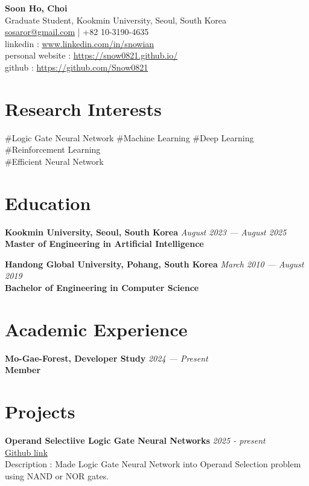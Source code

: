 \documentclass[11pt, a4paper]{article}
\newcommand{\itemheader}[2]{
    \noindent\textbf{#1} \hfill \textit{#2} \\
}
\begin{document}
{\huge \textbf{Soon Ho, Choi}}\\[0.1cm]
Graduate Student, Kookmin University, Seoul, South Korea \\
\href{mailto:sosaror@gmail.com}{sosaror@gmail.com} | +82 10-3190-4635 \\
linkedin : \href{https://www.linkedin.com/in/snowian}{www.linkedin.com/in/snowian} \\
personal website : \href{https://snow0821.github.io/}{https://snow0821.github.io/} \\
github : \href{https://github.com/Snow0821}{https://github.com/Snow0821}

\vspace{0.3cm}

\section*{Research Interests}
\noindent
\#Logic Gate Neural Network 
\#Machine Learning 
\#Deep Learning 
\#Reinforcement Learning \\
\#Efficient Neural Network

\section*{Education}
\itemheader{Kookmin University, Seoul, South Korea}{August 2023 — August 2025}
\textbf{Master of Engineering in Artificial Intelligence} \\

\vspace{0.3cm}

\itemheader{Handong Global University, Pohang, South Korea}{March 2010 — August 2019}
\textbf{Bachelor of Engineering in Computer Science} 

\section*{Academic Experience}
\itemheader{Mo-Gae-Forest, Developer Study}{2024 — Present}
\textbf{Member}

\section*{Projects}
\itemheader{Operand Selectiive Logic Gate Neural Networks}{2025 - present}
\href{https://github.com/Snow0821/oslgn}{Github link}\\
Description : Made Logic Gate Neural Network into Operand Selection problem using NAND or NOR gates.\\
\end{document}
